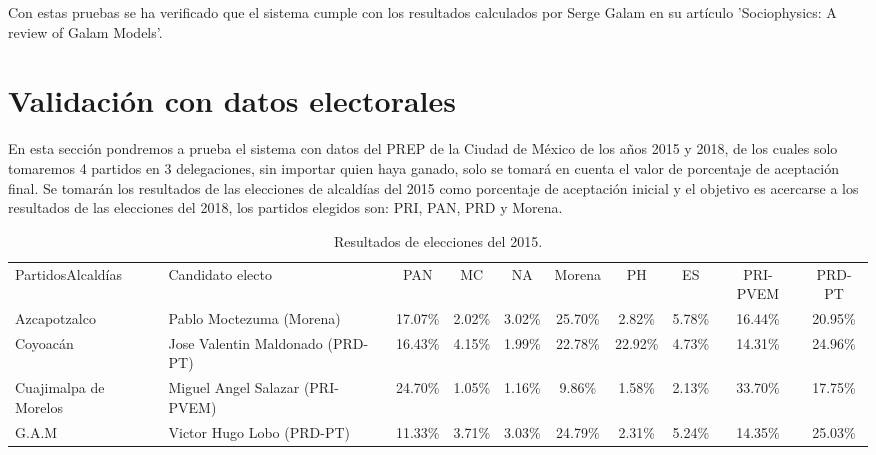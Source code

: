 Con estas pruebas se ha verificado que el sistema cumple con los resultados calculados por Serge Galam en su artículo 'Sociophysics: A review of Galam Models'.

\clearpage
\section{Validación con datos electorales}
En esta sección pondremos a prueba el sistema con datos del PREP de la Ciudad de México de los años 2015 y 2018, de los cuales solo tomaremos 4 partidos en 3 delegaciones, sin importar quien haya ganado, solo se tomará en cuenta el valor de porcentaje de aceptación final. Se tomarán los resultados de las elecciones de alcaldías del 2015 como porcentaje de aceptación inicial y el objetivo es acercarse a los resultados de las elecciones del 2018, los partidos elegidos son: PRI, PAN, PRD y Morena.

\begin{table}[h]
\centering
\resizebox{15cm}{!} {
\begin{tabular}{m{2.5cm}m{3cm}cccccccc}
\rowcolor[HTML]{3166FF} 
{\color[HTML]{FFFFFF} Partidos\newline Alcaldías} & {\color[HTML]{FFFFFF} Candidato electo} & {\color[HTML]{FFFFFF} PAN} & {\color[HTML]{FFFFFF} MC} & {\color[HTML]{FFFFFF} NA} & {\color[HTML]{FFFFFF} Morena} & {\color[HTML]{FFFFFF} PH} & {\color[HTML]{FFFFFF} ES} & {\color[HTML]{FFFFFF} PRI-PVEM} & {\color[HTML]{FFFFFF} PRD-PT} \\
Azcapotzalco & Pablo Moctezuma (Morena) & 17.07\%  & 2.02\%  & 3.02\%  & 25.70\%  & 2.82\%  & 5.78\%  & 16.44\%  & 20.95\%  \\
Coyoacán & Jose Valentin Maldonado (PRD-PT) & 16.43\%  & 4.15\%  & 1.99\%  & 22.78\%  & 22.92\%  & 4.73\%  & 14.31\%  & 24.96\%  \\
Cuajimalpa de Morelos & Miguel Angel Salazar (PRI-PVEM) & 24.70\%  & 1.05\%  & 1.16\%  & 9.86\%  & 1.58\%  & 2.13\%  & 33.70\% & 17.75\%  \\
G.A.M & Victor Hugo Lobo (PRD-PT)& 11.33\%  & 3.71\%  & 3.03\%  & 24.79\%  & 2.31\%  & 5.24\%  & 14.35\%  & 25.03\% 
\end{tabular}
}
\caption{Resultados de elecciones del 2015. \cite{IEDF2015}}
\label{table:Elecciones2015}
\end{table}

